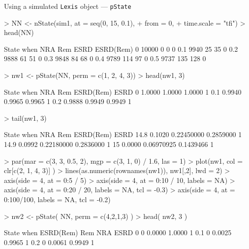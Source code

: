 \begin{frame}{Using a simulated \texttt{Lexis} object --- \texttt{pState}}
\begin{Schunk}
\begin{Sinput}
> NN <- nState(sim1, at = seq(0, 15, 0.1),
+                  from = 0,
+            time.scale = "tfi")
> head(NN)
\end{Sinput}
\begin{Soutput}
     State
when    NRA   Rem  ESRD ESRD(Rem)
  0   10000     0     0         0
  0.1  9940    25    35         0
  0.2  9888    61    51         0
  0.3  9848    84    68         0
  0.4  9789   114    97         0
  0.5  9737   135   128         0
\end{Soutput}
\begin{Sinput}
> nw1 <- pState(NN, perm = c(1, 2, 4, 3))
> head(nw1, 3)
\end{Sinput}
\begin{Soutput}
     State
when     NRA    Rem ESRD(Rem) ESRD
  0   1.0000 1.0000    1.0000    1
  0.1 0.9940 0.9965    0.9965    1
  0.2 0.9888 0.9949    0.9949    1
\end{Soutput}
\begin{Sinput}
> tail(nw1, 3)
\end{Sinput}
\begin{Soutput}
      State
when      NRA        Rem ESRD(Rem) ESRD
  14.8 0.1020 0.22450000 0.2859000    1
  14.9 0.0992 0.22180000 0.2836000    1
  15   0.0000 0.06970925 0.1439466    1
\end{Soutput}
\begin{Sinput}
> par(mar = c(3, 3, 0.5, 2), mgp = c(3, 1, 0) / 1.6, las = 1)
> plot(nw1, col = clr[c(2, 1, 4, 3)] )
> lines(as.numeric(rownames(nw1)), nw1[,2], lwd = 2)
> axis(side = 4, at = 0:5 / 5)
> axis(side = 4, at = 0:10 / 10, labels = NA)
> axis(side = 4, at = 0:20 / 20, labels = NA, tcl = -0.3)
> axis(side = 4, at = 0:100/100, labels = NA, tcl = -0.2)
\end{Sinput}
\end{Schunk}
\begin{Schunk}
\begin{Sinput}
> nw2 <- pState( NN, perm = c(4,2,1,3) )
> head( nw2, 3 )
\end{Sinput}
\begin{Soutput}
     State
when  ESRD(Rem)    Rem    NRA ESRD
  0           0 0.0000 1.0000    1
  0.1         0 0.0025 0.9965    1
  0.2         0 0.0061 0.9949    1

\end{Soutput}
\end{Schunk}
\end{frame}
